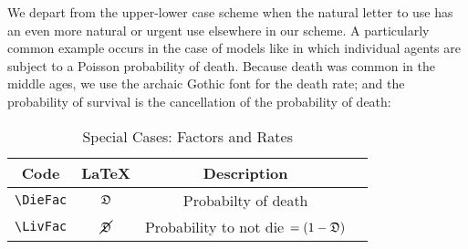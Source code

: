 We depart from the upper-lower case scheme when the natural letter to use has an even more natural or urgent use elsewhere in our scheme.
A particularly common example occurs in the case of models like \cite{blanchardFinite} in which
individual agents are subject to a Poisson probability of death.  Because death was common in the
middle ages, we use the archaic Gothic font for the death rate; and the probability of survival is the cancellation of the probability of death:
\begin{table}[h]
	\centering
	\begin{tabular}{|>{\ttfamily}cccl|}
		\hline
		 Code & LaTeX & Description &  \\
		\hline
   \verb|\DieFac|     & $\mathfrak{D}$     & Probabilty of death &
\\ \verb|\LivFac|     & $\cancel{\mathfrak{D}}$     & Probability to not die $=(1-\mathfrak{D})$ &
\\	\hline
	\end{tabular}
	\caption{Special Cases: Factors and Rates}
	\label{table:SpecialFactors}
\end{table}


